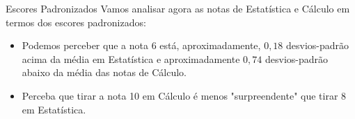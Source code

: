     \begin{frame}{Escores Padronizados}
     Vamos analisar agora as notas de Estatística e Cálculo em termos dos escores padronizados:

     \centering
    
    \begin{itemize}
        \item Podemos perceber que a nota 6 está, aproximadamente, $0,18$ desvios-padrão acima da média em Estatística
         e aproximadamente $0,74$ desvios-padrão abaixo da média das notas de Cálculo. 
         \item Perceba que tirar a nota 10 em Cálculo é menos "surpreendente" que tirar 8 em Estatística.  
    \end{itemize}
\end{frame}



